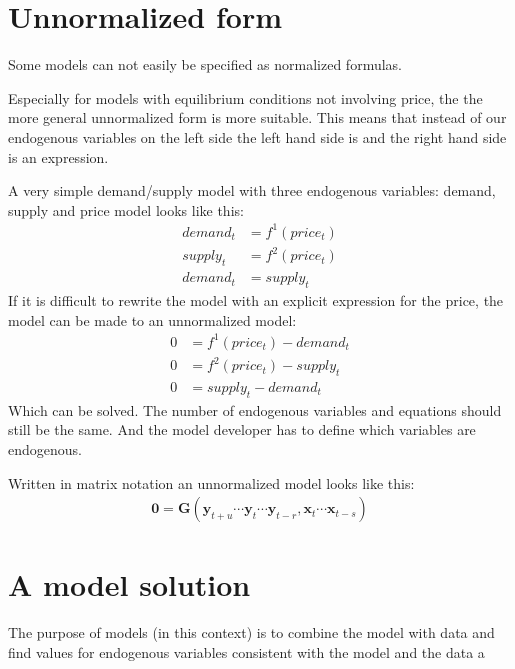 \documentclass[letterpaper,10pt,english]{jupyterBook}
\begin{document}
\section{Un\sphinxhyphen{}normalized form}
\label{\detokenize{content/notebooks/intro/model and solution:un-normalized-form}}
\sphinxAtStartPar
Some models can not easily be specified as normalized formulas.

\sphinxAtStartPar
Especially for models with equilibrium conditions not involving price, the the more general un\sphinxhyphen{}normalized form is more suitable. This means that instead of our endogenous variables on the left side the left hand side is  and the right hand side is an expression.

\sphinxAtStartPar
A very simple demand/supply model with three endogenous variables: demand, supply and price model looks like this:
\begin{align*}
demand_t  &=  f^1(price_t) \\
supply_t  &= f^2(price_t)\\ 
demand_t &= supply_t
\end{align*}
\sphinxAtStartPar
If it is difficult to rewrite the model with  an explicit expression for the price, the model can be made to an un\sphinxhyphen{}normalized model:
\begin{align*}
0   &=  f^1(price_t)-demand_t \\
0 &= f^2(price_t)-supply_t\\ 
0 &= supply_t-demand_t
\end{align*}
\sphinxAtStartPar
Which can be solved.
The number of endogenous variables and equations should still be the same. And the model developer has to define which variables are endogenous.

\sphinxAtStartPar
Written in matrix notation an un\sphinxhyphen{}normalized model looks like this:
\begin{equation*}
\begin{split}
\mathbf{0} = \mathbf{G}(\mathbf{y}_{t+u} \cdots \mathbf{y}_t \cdots \mathbf{y}_{t-r},\mathbf{x}_t \cdots \mathbf{x}_{t-s})
\end{split}
\end{equation*}

\section{A model solution}
\label{\detokenize{content/notebooks/intro/model and solution:a-model-solution}}
\sphinxAtStartPar
The purpose of models (in this context) is to combine the model with data and find values for endogenous variables consistent with the model and the data \sphinxhyphen{} a 
\end{document}
